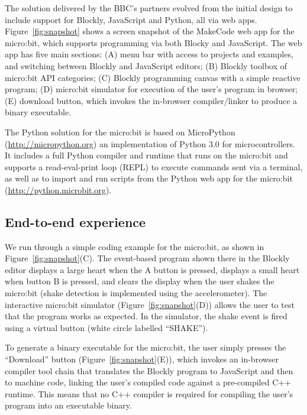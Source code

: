

The solution delivered by the BBC's partners evolved from the initial
design to include support for Blockly, JavaScript and Python, all
via web apps.
Figure~\ref{fig:snapshot} shows a screen snapshot of the MakeCode web app
for the micro:bit,
which supports programming via both Blocky and JavaScript.
The web app has five main sections: (A) menu bar with access to projects
and examples, and switching between Blockly and JavaScript editors; (B)
Blockly toolbox of micro:bit API categories; (C) Blockly programming
canvas with a simple reactive program; (D) micro:bit simulator for execution
of the user's program in browser; (E) download button, which invokes the in-browser
compiler/linker to produce a binary executable.

The Python solution for the micro:bit is based on MicroPython (\url{http://micropython.org})
an implementation of Python 3.0 for microcontrollers. It includes
a full Python compiler and runtime that runs on the micro:bit and
supports a read-eval-print loop (REPL) to execute commands sent via
a terminal, as well as to import and run scripts from the Python web app for
the micro:bit (\url{http://python.microbit.org}).

\subsection{End-to-end experience}

We run through a simple coding example for the micro:bit, as shown
in Figure~\ref{fig:snapshot}(C). The event-based program shown there
in the Blockly editor displays a large heart when the
A button is pressed, displays a small heart when button B is pressed,
and clears the display when the user shakes the micro:bit (shake
detection is implemented using the accelerometer). The interactive
micro:bit simulator
(Figure~\ref{fig:snapshot}(D)) allows the user to test that
the program works as expected. In the simulator, the
shake event is fired using a virtual button (white circle labelled
``SHAKE'').

To generate a binary executable for the micro:bit, the user
simply presses the ``Download'' button (Figure~\ref{fig:snapshot}(E)),
which invokes an in-browser compiler tool chain that translates
the Blockly program to JavaScript and then to machine code, linking
the user's compiled code against a pre-compiled
C++ runtime. This means that no C++ compiler is required for
compiling the user's program into an executable binary.

